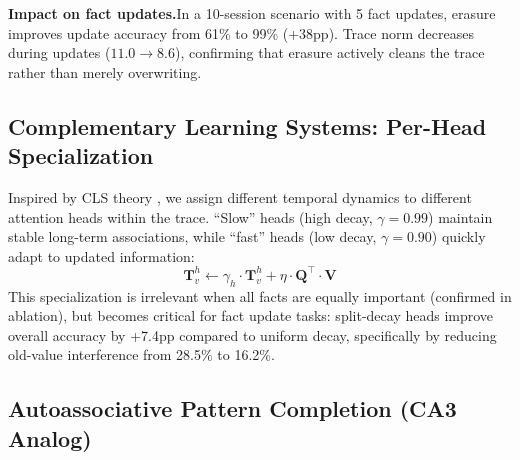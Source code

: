\documentclass[11pt,a4paper]{article}
\begin{document}
\textbf{Impact on fact updates.}\quad In a 10-session scenario with 5 fact updates, erasure improves update accuracy from 61\% to 99\% (+38pp). Trace norm decreases during updates ($11.0 \to 8.6$), confirming that erasure actively cleans the trace rather than merely overwriting.

\subsection{Complementary Learning Systems: Per-Head Specialization}
\label{sec:cls}

Inspired by CLS theory \citep{mcclelland1995complementary}, we assign different temporal dynamics to different attention heads within the trace. ``Slow'' heads (high decay, $\gamma{=}0.99$) maintain stable long-term associations, while ``fast'' heads (low decay, $\gamma{=}0.90$) quickly adapt to updated information:
\begin{equation}
  \mathbf{T}_v^h \leftarrow \gamma_h \cdot \mathbf{T}_v^h + \eta \cdot \mathbf{Q}^\top \cdot \mathbf{V}
  \label{eq:cls}
\end{equation}
This specialization is irrelevant when all facts are equally important (confirmed in ablation), but becomes critical for fact update tasks: split-decay heads improve overall accuracy by +7.4pp compared to uniform decay, specifically by reducing old-value interference from 28.5\% to 16.2\%.

\subsection{Autoassociative Pattern Completion (CA3 Analog)}
\label{sec:tauto}
\end{document}
